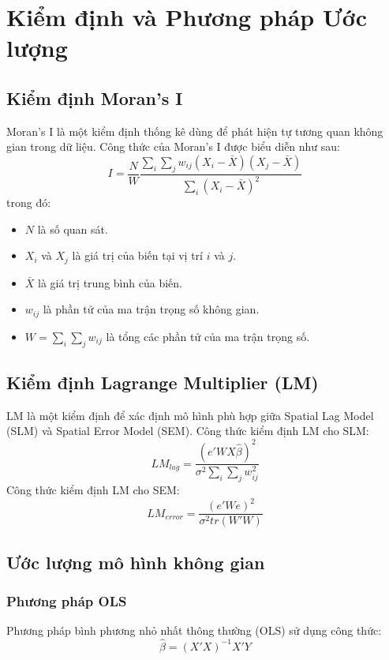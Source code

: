 \chapter{Kiểm định và Phương pháp Ước lượng}
\section{Kiểm định Moran’s I}
Moran’s I là một kiểm định thống kê dùng để phát hiện tự tương quan không gian trong dữ liệu. Công thức của Moran’s I được biểu diễn như sau:
\begin{equation}
    I = \frac{N}{W} \frac{\sum_{i} \sum_{j} w_{ij} (X_i - \bar{X}) (X_j - \bar{X})}{\sum_{i} (X_i - \bar{X})^2}
\end{equation}
trong đó:
\begin{itemize}
    \item $N$ là số quan sát.
    \item $X_i$ và $X_j$ là giá trị của biến tại vị trí $i$ và $j$.
    \item $\bar{X}$ là giá trị trung bình của biến.
    \item $w_{ij}$ là phần tử của ma trận trọng số không gian.
    \item $W = \sum_{i} \sum_{j} w_{ij}$ là tổng các phần tử của ma trận trọng số.
\end{itemize}

\section{Kiểm định Lagrange Multiplier (LM)}
LM là một kiểm định để xác định mô hình phù hợp giữa Spatial Lag Model (SLM) và Spatial Error Model (SEM). Công thức kiểm định LM cho SLM:
\begin{equation}
    LM_{lag} = \frac{(e' W X \hat{\beta})^2}{\sigma^2 \sum_{i} \sum_{j} w_{ij}^2}
\end{equation}
Công thức kiểm định LM cho SEM:
\begin{equation}
    LM_{error} = \frac{(e' W e)^2}{\sigma^2 tr(W'W)}
\end{equation}

\section{Ước lượng mô hình không gian}
\subsection{Phương pháp OLS}
Phương pháp bình phương nhỏ nhất thông thường (OLS) sử dụng công thức:
\begin{equation}
    \hat{\beta} = (X'X)^{-1} X'Y
\end{equation}

